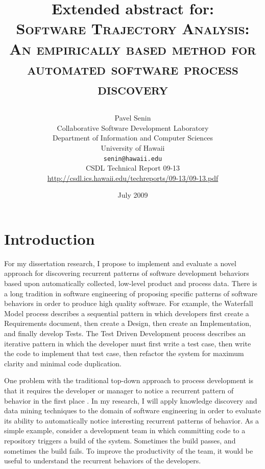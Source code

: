 \documentclass[11pt,oneside]{article}
\begin{document}
\title{Extended abstract for: \\
       \textsc{Software Trajectory Analysis:} \\
       \textsc{An empirically based method for automated software process discovery} \\
       \author{Pavel Senin \\
							 Collaborative Software Development Laboratory \\
               Department of Information and Computer Sciences \\
               University of Hawaii \\[0.3cm]
               \texttt{senin@hawaii.edu} \\[0.3cm]
               CSDL Technical Report 09-13 \\
               \url{http://csdl.ics.hawaii.edu/techreports/09-13/09-13.pdf}
       }
       \date{July 2009}
}
\maketitle

\clearpage


\section{Introduction}
For my dissertation research, I propose to implement and evaluate a novel approach for discovering recurrent patterns of software development behaviors based upon automatically collected, low-level product and process data. There is a long tradition in software engineering of proposing specific patterns of software behaviors in order to produce high quality software. For example, the Waterfall Model process describes a sequential pattern in which developers first create a Requirements document, then create a Design, then create an Implementation, and finally develop Tests. The Test Driven Development process describes an iterative pattern in which the developer must first write a test case, then write the code to implement that test case, then refactor the system for maximum clarity and minimal code duplication.

One problem with the traditional top-down approach to process development is that it requires the developer or manager to notice a recurrent pattern of behavior in the first place \cite{citeulike:5043104}. In my research, I will apply knowledge discovery and data mining techniques to the domain of software engineering in order to evaluate its ability to automatically notice interesting recurrent patterns of behavior. As a simple example, consider a development team in which committing code to a repository triggers a build of the system. Sometimes the build passes, and sometimes the build fails. To improve the productivity of the team, it would be useful to understand the recurrent behaviors of the developers. 
\end{document}
